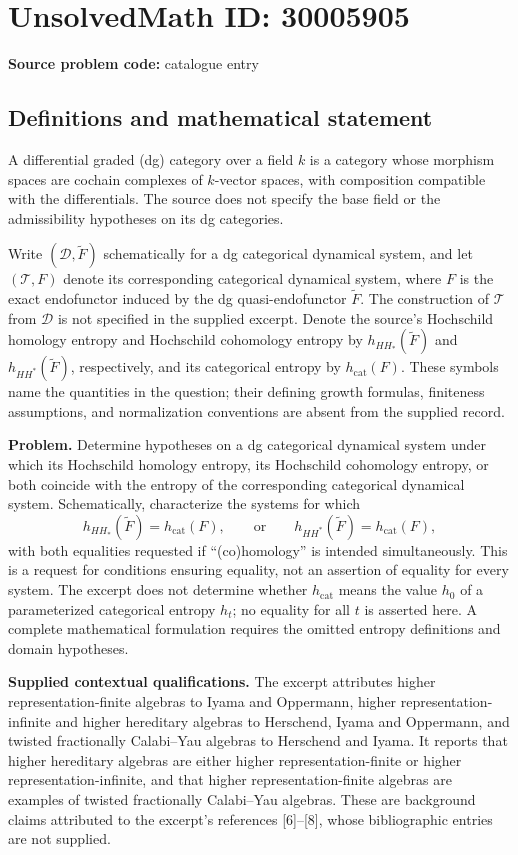 \documentclass[11pt]{article}
\begin{document}
\section*{UnsolvedMath ID: 30005905}
\textbf{Source problem code:} catalogue entry
\subsection{Definitions and mathematical statement}
A differential graded (dg) category over a field \(k\) is a category whose morphism spaces are cochain complexes of \(k\)-vector spaces, with composition compatible with the differentials. The source does not specify the base field or the admissibility hypotheses on its dg categories.

Write \((\mathcal D,\widetilde F)\) schematically for a dg categorical dynamical system, and let \((\mathcal T,F)\) denote its corresponding categorical dynamical system, where \(F\) is the exact endofunctor induced by the dg quasi-endofunctor \(\widetilde F\). The construction of \(\mathcal T\) from \(\mathcal D\) is not specified in the supplied excerpt. Denote the source's Hochschild homology entropy and Hochschild cohomology entropy by \(h_{HH_*}(\widetilde F)\) and \(h_{HH^*}(\widetilde F)\), respectively, and its categorical entropy by \(h_{\mathrm{cat}}(F)\). These symbols name the quantities in the question; their defining growth formulas, finiteness assumptions, and normalization conventions are absent from the supplied record.

\textbf{Problem.} Determine hypotheses on a dg categorical dynamical system under which its Hochschild homology entropy, its Hochschild cohomology entropy, or both coincide with the entropy of the corresponding categorical dynamical system. Schematically, characterize the systems for which
\[
 h_{HH_*}(\widetilde F)=h_{\mathrm{cat}}(F),
 \qquad\text{or}\qquad
 h_{HH^*}(\widetilde F)=h_{\mathrm{cat}}(F),
\]
with both equalities requested if ``(co)homology'' is intended simultaneously. This is a request for conditions ensuring equality, not an assertion of equality for every system. The excerpt does not determine whether \(h_{\mathrm{cat}}\) means the value \(h_0\) of a parameterized categorical entropy \(h_t\); no equality for all \(t\) is asserted here. A complete mathematical formulation requires the omitted entropy definitions and domain hypotheses.

\textbf{Supplied contextual qualifications.} The excerpt attributes higher representation-finite algebras to Iyama and Oppermann, higher representation-infinite and higher hereditary algebras to Herschend, Iyama and Oppermann, and twisted fractionally Calabi--Yau algebras to Herschend and Iyama. It reports that higher hereditary algebras are either higher representation-finite or higher representation-infinite, and that higher representation-finite algebras are examples of twisted fractionally Calabi--Yau algebras. These are background claims attributed to the excerpt's references [6]--[8], whose bibliographic entries are not supplied.
\end{document}
